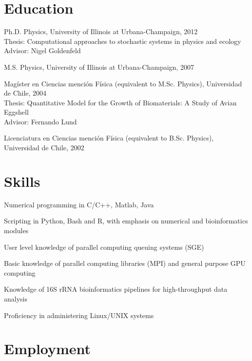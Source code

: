 \documentclass[letterpaper]{article}
\renewenvironment{itemize}{
  \begin{list}{}{
    \setlength{\leftmargin}{1.5em}
  }
}{
  \end{list}
}
\begin{document}
\section*{Education}

\begin{itemize}
  \item Ph.D. Physics, University of Illinois at Urbana-Champaign, 2012 \\
  Thesis: Computational approaches to stochastic systems in physics and ecology \\
  Advisor: Nigel Goldenfeld

  \item M.S. Physics, University of Illinois at Urbana-Champaign, 2007
  
  \item Magíster en Ciencias mención Física (equivalent to M.Sc. Physics),
  Universidad de Chile, 2004\\ Thesis: Quantitative Model for the Growth of Biomaterials: A Study of Avian
  Eggshell \\
  Advisor: Fernando Lund
  
  \item Licenciatura en Ciencias mención Física (equivalent to B.Sc. Physics),
  Universidad de Chile, 2002
\end{itemize}

\section*{Skills}
\begin{itemize}
    \item Numerical programming in C/C++, Matlab, Java
    \item Scripting in Python, Bash and R, with emphasis on numerical and bioinformatics modules
    \item User level knowledge of parallel computing queuing systems (SGE)
    \item Basic knowledge of parallel computing libraries (MPI) and general purpose GPU computing
    \item Knowledge of 16S rRNA bioinformatics pipelines for high-throughput
    data analysis
    \item Proficiency in administering Linux/UNIX systems
\end{itemize}


\section*{Employment}
\end{document}
